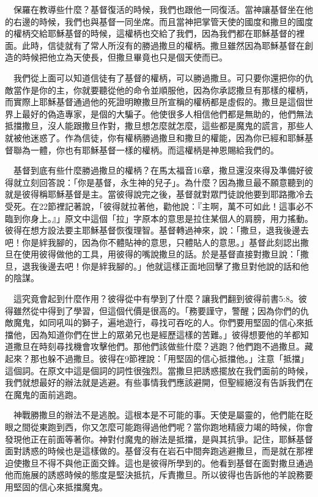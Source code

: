 \documentclass{book}
\begin{document}
　保羅在教導些什麼？基督復活的時候，我們也跟他一同復活。當神讓基督坐在他的右邊的時候，我們也與基督一同坐席。而且當神把掌管天使的國度和撒旦的國度的權柄交給耶穌基督的時候，這權柄也交給了我們，因為我們都在耶穌基督的裡面。此時，信徒就有了常人所沒有的勝過撒旦的權柄。撒旦雖然因為耶穌基督在創造的時候把他立為天使長，但撒旦畢竟也只是個天使而已。

　我們從上面可以知道信徒有了基督的權柄，可以勝過撒旦。可只要你還把你的仇敵當作是你的主，你就要聽從他的命令並順服他，因為你承認撒旦有那樣的權柄，而實際上耶穌基督通過他的死證明瞭撒旦所宣稱的權柄都是虛假的。撒旦是這個世界上最好的偽造專家，是個的大騙子。他使很多人相信他們都是無助的，他們無法抵擋撒旦，沒人能跟撒旦作對，撒旦想怎麼就怎麼，這些都是魔鬼的謊言，那些人就被他迷惑了。作為信徒，你有權柄勝過撒旦和撒旦的權能，因為你已經和耶穌基督聯為一體，你也有耶穌基督一樣的權柄。而這權柄是神恩賜給我們的。

　基督到底有些什麼勝過撒旦的權柄？在馬太福音16章，撒旦還沒來得及準備好彼得就立刻回答說：「你是基督，永生神的兒子」。為什麼？因為撒旦最不願意聽到的就是彼得稱耶穌基督是主。當彼得說完之後，基督就對眾門徒說他要到耶路撒冷去受死。在22節裡記著說，「彼得就拉著他，勸他說：『主啊，萬不可如此！這事必不臨到你身上。』」原文中這個「拉」字原本的意思是拉住某個人的肩膀，用力搖動。彼得在想方設法要主耶穌基督恢復理智。基督轉過神來，說：「撒旦，退我後邊去吧！你是絆我腳的，因為你不體貼神的意思，只體貼人的意思。」基督此刻認出撒旦在使用彼得做他的工具，用彼得的嘴說撒旦的話。於是基督直接對撒旦說：「撒旦，退我後邊去吧！你是絆我腳的。」他就這樣正面地回擊了撒旦對他說的話和他的陰謀。

　這究竟會起到什麼作用？彼得從中有學到了什麼？讓我們翻到彼得前書5:8。彼得雖然從中得到了學習，但這個代價是很高的。「務要謹守，警醒；因為你們的仇敵魔鬼，如同吼叫的獅子，遍地遊行，尋找可吞吃的人。你們要用堅固的信心來抵擋他，因為知道你們在世上的眾弟兄也是經歷這樣的苦難。」彼得想要他的羊都知道撒旦在時刻尋找機會攻擊他們。那他們該做些什麼？逃跑？他們跑不過撒旦。藏起來？那也躲不過撒旦。彼得在9節裡說：「用堅固的信心抵擋他。」注意「抵擋」這個詞。在原文中這是個詞的詞性很強烈。當撒旦把誘惑擺放在我們面前的時候，我們就想最好的辦法就是逃避。有些事情我們應該避開，但聖經絕沒有告訴我們在在魔鬼的面前逃跑。

　神戰勝撒旦的辦法不是逃脫。這根本是不可能的事。天使是屬靈的，他們能在眨眼之間從東跑到西，你又怎麼可能跑得過他們呢？當你跑地精疲力竭的時候，你會發現他正在前面等著你。神對付魔鬼的辦法是抵擋，是與其抗爭。記住，耶穌基督面對誘惑的時候也是這樣做的。基督沒有在岩石中間奔跑逃避撒旦，而是就在那裡迫使撒旦不得不與他正面交鋒。這也是彼得所學到的。他看到基督在面對撒旦通過他而施展的誘惑時候的態度是堅決抵抗，斥責撒旦。所以彼得也告訴他的羊說務要用堅固的信心來抵擋魔鬼。
\end{document}

